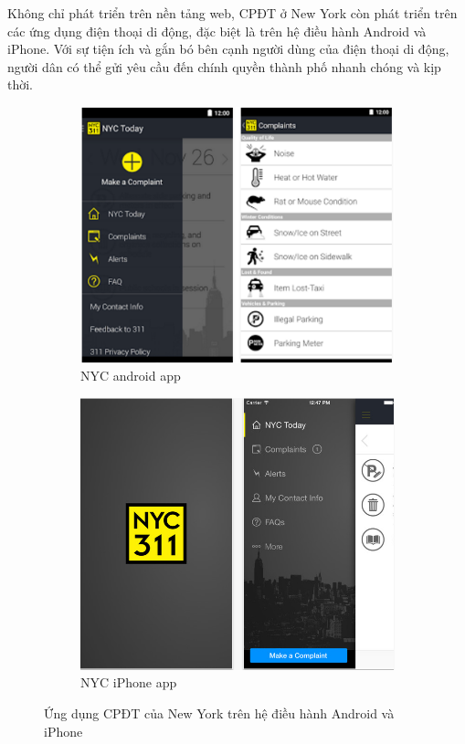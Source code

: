 \documentclass[a4paper]{article}
\begin{document}
Không chỉ phát triển trên nền tảng web, CPĐT ở New York còn phát triển trên các ứng dụng điện thoại di động, đặc biệt là trên hệ điều hành Android và iPhone. Với sự tiện ích và gắn bó bên cạnh người dùng của điện thoại di động, người dân có thể gửi yêu cầu đến chính quyền thành phố nhanh chóng và kịp thời.
\begin{figure}[h]
\centering
\begin{subfigure}{.5\textwidth}
  \centering
  \includegraphics[width=0.9\linewidth]{newyork_android.PNG}
  \caption{NYC android app}
\end{subfigure}%
\begin{subfigure}{.5\textwidth}
  \centering
  \includegraphics[width=0.9\linewidth]{newyork_iphones.PNG}
  \caption{NYC iPhone app}
  \label{fig:sub2}
\end{subfigure}
\caption{Ứng dụng CPĐT của New York trên hệ điều hành Android và iPhone}
\end{figure}
\end{document}
